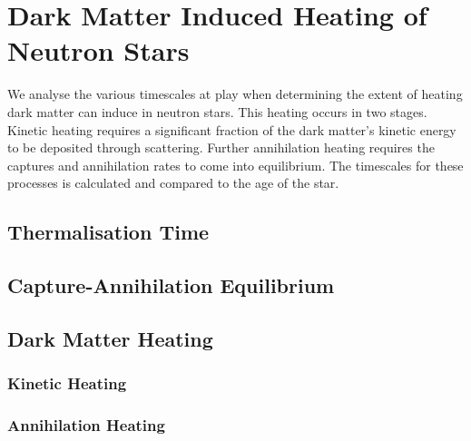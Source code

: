 \graphicspath{{img/chapter_5/}}

\chapter{Dark Matter Induced Heating of Neutron Stars }
\label{chapter:heating}

\begin{synopsis}
  We analyse the various timescales at play when determining the extent of heating dark matter can induce in neutron stars. This heating occurs in two stages. Kinetic heating requires a significant fraction of the dark matter's kinetic energy to be deposited through scattering. Further annihilation heating requires the captures and annihilation rates to come into equilibrium. The timescales for these processes is calculated and compared to the age of the star. 
\end{synopsis}

  \section{Thermalisation Time}


  \section{Capture-Annihilation Equilibrium}
  
  \section{Dark Matter Heating}

  \subsection{Kinetic Heating}

  \subsection{Annihilation Heating}

  